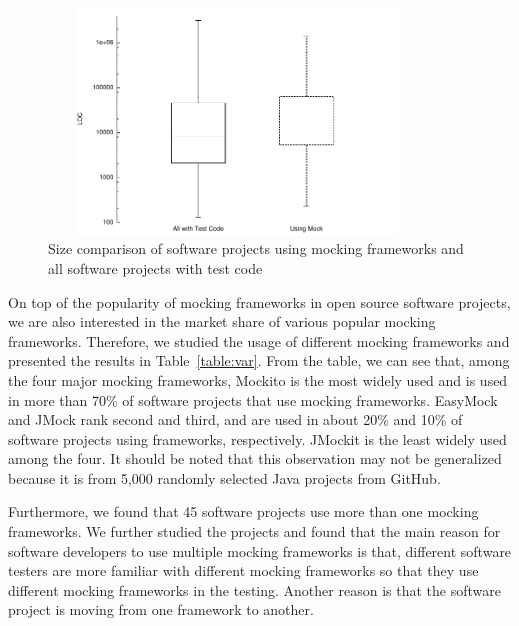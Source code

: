 \begin{figure}
\vspace{-0.3cm}

  \center
\includegraphics[width=100mm, height=60mm]{boxplot.pdf}
\vspace{-0.3cm}
  \caption{\label{fig:box} Size comparison of software projects using mocking frameworks and all software projects with test code}
  \vspace{-0.3cm}

\end{figure}

                       
On top of the popularity of mocking frameworks in open source software projects, we are also interested in the market share of various popular mocking frameworks. Therefore, we studied the usage of different mocking frameworks and presented the results in Table~\ref{table:var}. From the table, we can see that, among the four major mocking frameworks, Mockito is the most widely used and is used in more than 70\% of software projects that use mocking frameworks. EasyMock and JMock rank second and third, and are used in about 20\% and 10\% of software projects using frameworks, respectively. JMockit is the least widely used among the four. It should be noted that this observation may not be generalized because it is from 5,000 randomly selected Java projects from GitHub. 

Furthermore, we found that 45 software projects use more than one mocking frameworks. We further studied the projects and found that the main reason for software developers to use multiple mocking frameworks is that, different software testers are more familiar with different mocking frameworks so that they use different mocking frameworks in the testing. Another reason is that the software project is moving from one framework to another. 

